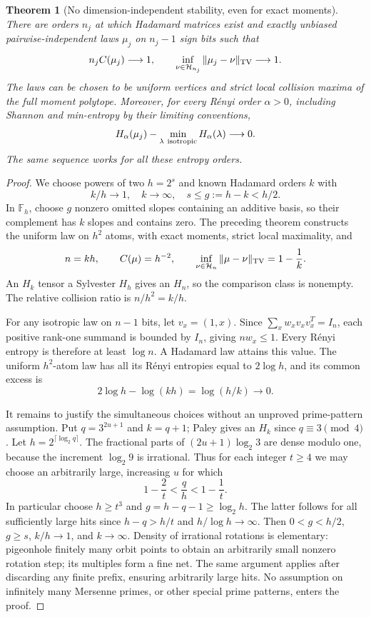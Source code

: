 \documentclass[11pt]{article}
\newtheorem{theorem}{Theorem}[section]
\begin{document}
\begin{theorem}[No dimension-independent stability, even for exact moments]
\label{thm:relative-no-stability}
There are orders $n_j$ at which Hadamard matrices exist and exactly
unbiased pairwise-independent laws $\mu_j$ on $n_j-1$ sign bits such that
\[
 n_j C(\mu_j)\longrightarrow1,\qquad
 \inf_{\nu\in\mathcal H_{n_j}}\|\mu_j-\nu\|_{\rm TV}
 \longrightarrow1.
\]
The laws can be chosen to be uniform vertices and strict local
collision maxima of the full moment polytope. Moreover, for every
R\'enyi order $\alpha>0$, including Shannon and min-entropy by their
limiting conventions,
\[
 H_\alpha(\mu_j)-\min_{\lambda\ {\rm isotropic}}H_\alpha(\lambda)
 \longrightarrow0.
\]
The same sequence works for all these entropy orders.
\end{theorem}
\begin{proof}
We choose powers of two $h=2^s$ and known Hadamard orders $k$ with
\[
 k/h\to1,\quad k\to\infty,\quad
 s\le g:=h-k<h/2.
\]
In $\mathbb F_h$, choose $g$ nonzero omitted slopes containing an
additive basis, so their complement has $k$ slopes and contains zero.
The preceding theorem constructs the uniform law on $h^2$ atoms,
with exact moments, strict local maximality, and
\[
 n=kh,\qquad C(\mu)=h^{-2},\qquad
 \inf_{\nu\in\mathcal H_n}\|\mu-\nu\|_{\rm TV}=1-\frac1k.
\]
An $H_k$ tensor a Sylvester $H_h$ gives an $H_n$, so the comparison
class is nonempty. The relative collision ratio is $n/h^2=k/h$.

For any isotropic law on $n-1$ bits, let $v_x=(1,x)$.
Since $\sum_xw_xv_xv_x^T=I_n$, each positive rank-one summand
is bounded by $I_n$, giving $nw_x\le1$.
Every R\'enyi entropy is therefore at least $\log n$.
A Hadamard law attains this value. The uniform $h^2$-atom law has
all its R\'enyi entropies equal to $2\log h$, and its common excess is
\[
                  2\log h-\log(kh)=\log(h/k)\to0.
\]

It remains to justify the simultaneous choices without an unproved
prime-pattern assumption. Put $q=3^{2u+1}$ and $k=q+1$; Paley gives
an $H_k$ since $q\equiv3\pmod4$. Let
$h=2^{\lceil\log_2 q\rceil}$. The fractional parts of
$(2u+1)\log_2 3$ are dense modulo one, because the increment
$\log_2 9$ is irrational. Thus for each integer $t\ge4$ we may choose
an arbitrarily large, increasing $u$ for which
\[
       1-\frac2t<\frac qh<1-\frac1t.
\]
In particular choose $h\ge t^3$ and
$g=h-q-1\ge\log_2h$. The latter follows for all sufficiently large
hits since $h-q>h/t$ and $h/\log h\to\infty$.
Then $0<g<h/2$, $g\ge s$, $k/h\to1$, and $k\to\infty$.
Density of irrational rotations is elementary: pigeonhole finitely
many orbit points to obtain an arbitrarily small nonzero rotation
step; its multiples form a fine net. The same argument applies
after discarding any finite prefix, ensuring arbitrarily large hits.
No assumption on infinitely many Mersenne primes, or other special
prime patterns, enters the proof.
\end{proof}
\end{document}
